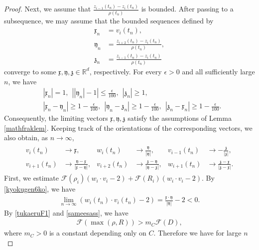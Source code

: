 \documentclass[reqno]{amsart}
\theoremstyle{plain}
\theoremstyle{definition}
\numberwithin{equation}{section}
\begin{document}
\begin{proof}
Next, we assume that $\frac{z_{i-1}(t_n)-z_i(t_n)}{\rho(t_n)}$ is bounded. After passing to a subsequence, we may assume that the bounded sequences defined by
\begin{align*}
\mathfrak{x}_n&=v_i(t_n),
\\
\mathfrak{y}_n&=
\frac{z_{i+2}(t_n)-z_i(t_n)}{\rho(t_n)},
\\
\mathfrak{z}_n&=
\frac{z_{i-1}(t_n)-z_i(t_n)}{\rho(t_n)}
\end{align*}
converge to some $\mathfrak{x},\mathfrak{y},\mathfrak{z}\in\mathbb{R}^d$, respectively. For every $\epsilon>0$ and all sufficiently large $n$, we have
\begin{align*}
&|\mathfrak{x}_n|=1,\ \ \left||\mathfrak{y}_n|-1\right|
\leq\frac{\epsilon}{100},\ \ |\mathfrak{z}_n|\geq1,
\\
&|\mathfrak{x}_n-\mathfrak{y}_n|\geq1-\frac{\epsilon}{100},\ \ |\mathfrak{y}_n-\mathfrak{z}_n|\geq1-\frac{\epsilon}{100},\ \ |\mathfrak{z}_n-\mathfrak{x}_n|\geq1-\frac{\epsilon}{100}.
\end{align*}
Consequently, the limiting vectors
$\mathfrak{x},\mathfrak{y},\mathfrak{z}$
satisfy the assumptions of Lemma \ref{mathfraklem}. Keeping track of the orientations of the corresponding vectors, we also obtain, as $n\to\infty$,
\begin{align}\label{kyokugen6ko}
\begin{aligned}
v_i(t_n)
&\to\mathfrak{x},
&
w_i(t_n)
&\to\frac{\mathfrak{y}}{|\mathfrak{y}|},
&
v_{i-1}(t_n)
&\to-\frac{\mathfrak{z}}{|\mathfrak{z}|},
\\
v_{i+1}(t_n)
&\to
\frac{\mathfrak{y}-\mathfrak{x}}
{|\mathfrak{x}-\mathfrak{y}|},
&
v_{i+2}(t_n)
&\to
\frac{\mathfrak{z}-\mathfrak{y}}
{|\mathfrak{y}-\mathfrak{z}|},
&
w_{i+1}(t_n)
&\to
\frac{\mathfrak{z}-\mathfrak{x}}
{|\mathfrak{z}-\mathfrak{x}|}.
\end{aligned}
\end{align}
First, we estimate $\mathcal{F}(\rho_i)(w_i\cdot v_i-2)+\mathcal{F}(R_i)(w_i\cdot v_i-2)$. By \eqref{kyokugen6ko}, we have
\begin{align*}
\lim_{n\to\infty}(w_i(t_n)\cdot v_i(t_n)-2)=\frac{\mathfrak{x}\cdot \mathfrak{y}}{|\mathfrak{y}|}-2<0.
\end{align*}
By \eqref{tukaeruF1} and \eqref{sameesass}, we have
\begin{align*}
\mathcal{F}(\max{(\rho,R)})>m_C\mathcal{F}(D),
\end{align*}
where $m_C>0$ is a constant depending only on $C$. Therefore we have for large $n$

\end{proof}
\end{document}
